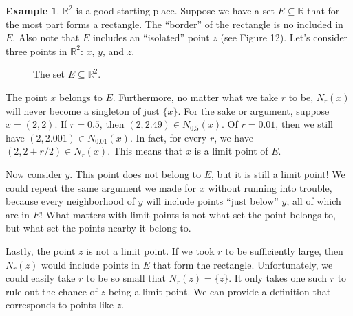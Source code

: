 \documentclass{article}
\newcommand{\R}{\mathbb{R}}
\theoremstyle{definition}
\newtheorem{example}{Example}[section]
\begin{document}
	\begin{example}
		$\R^2$ is a good starting place. Suppose we have a set $ E\subseteq \R $ that for the most part forms a rectangle. The ``border'' of the rectangle is no included in $ E $. Also note that $ E $ includes an ``isolated'' point $ z $ (see Figure 12). Let's consider three points in $ \R^2 $: $ x $, $ y $, and $ z $.  
		\begin{figure}[h]
			\centering
			\caption{The set $ E\subseteq \R^2 $.}
		\end{figure}
		
		The point $ x $ belongs to $ E $. Furthermore, no matter what we take $ r $ to be, $ N_r(x) $ will never become a singleton of just $ \{x\} $. For the sake or argument, suppose $ x=(2,2) $. If $ r=0.5 $, then $ (2,2.49)\in N_{0.5}(x) $. Of $ r=0.01 $, then we still have $ (2,2.001)\in N_{0.01}(x) $. In fact, for every $ r $, we have $ (2,2+r/2)\in N_r(x) $. This means that $ x $ is a limit point of $ E $. 
		
		Now consider $ y $. This point does not belong to $ E $, but it is still a limit point! We could repeat the same argument we made for $ x $ without running into trouble, because every neighborhood of $ y $ will include points ``just below'' $ y $, all of which are in $ E $! What matters with limit points is not what set the point belongs to, but what set the points nearby it belong to. 
		
		Lastly, the point $ z $ is not a limit point. If we took $ r $ to be sufficiently large, then $ N_r(z) $ would include points in $ E $ that form the rectangle. Unfortunately, we could easily take $ r$ to be so small that $ N_r(z)=\{z\} $. It only takes one such $ r $ to rule out the chance of $ z $ being a limit point. We can provide a definition that corresponds to points like $ z $.     
	\end{example}
	
\end{document}
